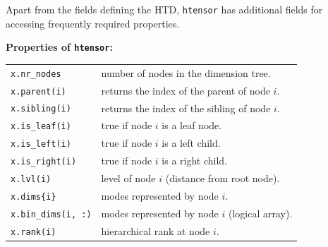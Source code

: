 \documentclass[11pt, a4paper]{article}
\begin{document}
\begin{preprint}
Apart from the fields defining the HTD, {\tt htensor} has additional fields
for accessing frequently required properties.
\begin{framed}\noindent 
\textbf{Properties of \texttt{htensor}:}\\
\begin{tabular}{ll}
\texttt{x.nr\_nodes} & number of nodes in the dimension tree.\\
\texttt{x.parent(i)} & returns the index of the parent of node $i$.\\
\texttt{x.sibling(i)} & returns the index of the sibling of node $i$.\\
\texttt{x.is\_leaf(i)} & true if node $i$ is a leaf node.\\
\texttt{x.is\_left(i)} & true if node $i$ is a left child.\\
\texttt{x.is\_right(i)} & true if node $i$ is a right child.\\
\texttt{x.lvl(i)} & level of node $i$ (distance from root node).\\
\texttt{x.dims\{i\}} & modes represented by node $i$.\\
\texttt{x.bin\_dims(i, :)} & modes represented by node $i$ (logical array).\\
\texttt{x.rank(i)} & hierarchical rank at node $i$.\\
\end{tabular}
\end{framed}
\end{preprint}
\end{document}

